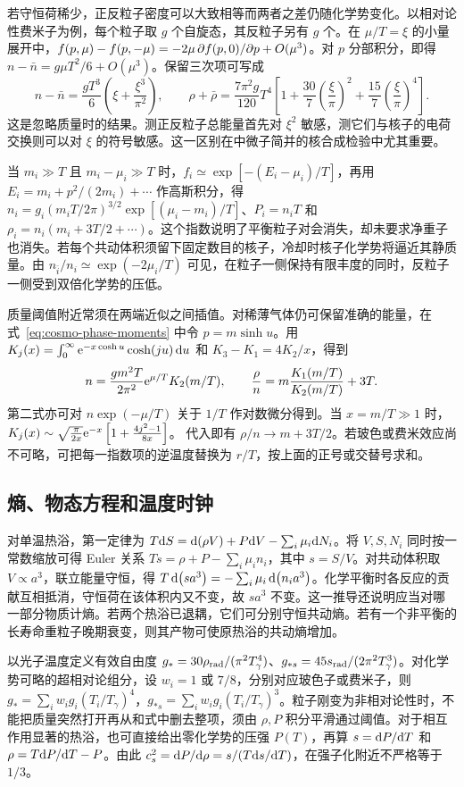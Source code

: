 若守恒荷稀少，正反粒子密度可以大致相等而两者之差仍随化学势变化。以相对论性费米子为例，每个粒子取 $g$ 个自旋态，其反粒子另有 $g$ 个。在 $\mu/T=\xi$ 的小量展开中，$f(p,\mu)-f(p,-\mu)=-2\mu\,\partial f(p,0)/\partial p+O(\mu^3)$。对 $p$ 分部积分，即得 $n-\bar n=g\mu T^2/6+O(\mu^3)$。保留三次项可写成
\[
 n-\bar n=\frac{gT^3}{6}\left(\xi+\frac{\xi^3}{\pi^2}\right),\qquad
 \rho+\bar\rho=\frac{7\pi^2g}{120}T^4
 \left[1+\frac{30}{7}\left(\frac{\xi}{\pi}\right)^2+
 \frac{15}{7}\left(\frac{\xi}{\pi}\right)^4\right].
\]
这是忽略质量时的结果。测正反粒子总能量首先对 $\xi^2$ 敏感，测它们与核子的电荷交换则可以对 $\xi$ 的符号敏感。这一区别在中微子简并的核合成检验中尤其重要。

当 $m_i\gg T$ 且 $m_i-\mu_i\gg T$ 时，$f_i\simeq\exp[-(E_i-\mu_i)/T]$，再用 $E_i=m_i+p^2/(2m_i)+\cdots$ 作高斯积分，得 $n_i=g_i(m_iT/2\pi)^{3/2}\exp[(\mu_i-m_i)/T]$、$P_i=n_i T$ 和 $\rho_i=n_i(m_i+3T/2+\cdots)$。这个指数说明了平衡粒子对会消失，却未要求净重子也消失。若每个共动体积须留下固定数目的核子，冷却时核子化学势将逼近其静质量。由 $n_{\bar i}/n_i\simeq\exp(-2\mu_i/T)$ 可见，在粒子一侧保持有限丰度的同时，反粒子一侧受到双倍化学势的压低。

质量阈值附近常须在两端近似之间插值。对稀薄气体仍可保留准确的能量，在式~\eqref{eq:cosmo-phase-moments} 中令 $p=m\sinh u$。用 $K_j(x)=\int_0^\infty \mathrm{e}^{-x\cosh u}\cosh(ju)\,\dd u$ 和 $K_3-K_1=4K_2/x$，得到
\[
 n=\frac{g m^2 T}{2\pi^2}\mathrm{e}^{\mu/T}K_2(m/T),\qquad
 \frac{\rho}{n}=m\frac{K_1(m/T)}{K_2(m/T)}+3T .
\]
第二式亦可对 $n\exp(-\mu/T)$ 关于 $1/T$ 作对数微分得到。当 $x=m/T\gg1$ 时， $K_j(x)\sim\allowbreak{}\sqrt{\frac{\pi}{2x}}\mathrm{e}^{-x} \left[1+\frac{4j^2-1}{8x}\right]$。
代入即有 $\rho/n\to m+3T/2$。若玻色或费米效应尚不可略，可把每一指数项的逆温度替换为 $r/T$，按上面的正号或交替号求和。

\subsection{熵、物态方程和温度时钟}

对单温热浴，第一定律为 $T\dd S=\dd(\rho V)+P\dd V-\sum_i\mu_i\dd N_i$。将 $V,S,N_i$ 同时按一常数缩放可得 Euler 关系 $Ts=\rho+P-\sum_i\mu_i n_i$，其中 $s=S/V$。对共动体积取 $V\propto a^3$，联立能量守恒，得 $T\dd(sa^3)=-\sum_i\mu_i\dd(n_i a^3)$。化学平衡时各反应的贡献互相抵消，守恒荷在该体积内又不变，故 $sa^3$ 不变。这一推导还说明应当对哪一部分物质计熵。若两个热浴已退耦，它们可分别守恒共动熵。若有一个非平衡的长寿命重粒子晚期衰变，则其产物可使原热浴的共动熵增加。

以光子温度定义有效自由度 $g_*=30\rho_{\rm rad}/(\pi^2T_\gamma^4)$、$g_{*s}=45s_{\rm rad}/(2\pi^2T_\gamma^3)$。对化学势可略的超相对论组分，设 $w_i=1$ 或 $7/8$，分别对应玻色子或费米子，则 $g_*=\sum_i w_i g_i(T_i/T_\gamma)^4$，$g_{*s}=\sum_i w_i g_i(T_i/T_\gamma)^3$。粒子刚变为非相对论性时，不能把质量突然打开再从和式中删去整项，须由 $\rho,P$ 积分平滑通过阈值。对于相互作用显著的热浴，也可直接给出零化学势的压强 $P(T)$，再算 $s=\dd P/\dd T$ 和 $\rho=T\dd P/\dd T-P$。由此 $c_s^2=\dd P/\dd\rho=s/(T\dd s/\dd T)$，在强子化附近不严格等于 $1/3$。

